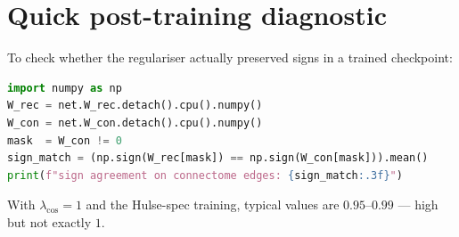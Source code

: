 \documentclass[11pt]{article}
\begin{document}
\section{Quick post-training diagnostic}

To check whether the regulariser actually preserved signs in a trained
checkpoint:

\begin{lstlisting}[language=Python]
import numpy as np
W_rec = net.W_rec.detach().cpu().numpy()
W_con = net.W_con.detach().cpu().numpy()
mask  = W_con != 0
sign_match = (np.sign(W_rec[mask]) == np.sign(W_con[mask])).mean()
print(f"sign agreement on connectome edges: {sign_match:.3f}")
\end{lstlisting}

With $\lambda_{\cos}=1$ and the Hulse-spec training, typical values are
$0.95$--$0.99$ --- high but not exactly $1$.
\end{document}
